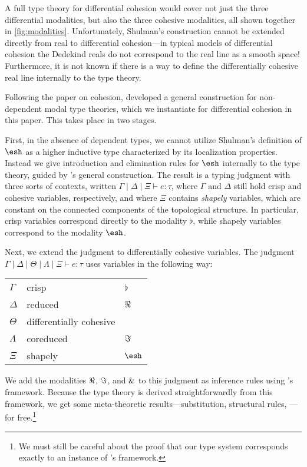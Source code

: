 \documentclass{article}
\begin{document}
A full type theory for differential cohesion would cover not just the three
differential modalities, but also the three cohesive modalities, all shown
together in \cref{fig:modalities}. Unfortunately, Shulman's construction cannot
be extended directly from real to differential cohesion---in typical models of
differential cohesion the Dedekind reals do not correspond to the real line as a
smooth space! Furthermore, it is not known if there is a way to define the
differentially cohesive real line internally to the type theory. 

Following the \citeyear{Licata2016} paper on cohesion, \citet{Licata2017}
developed a general construction for non-dependent modal type theories, which we
instantiate for differential cohesion in this paper. This takes place in two
stages.

First, in the absence of dependent types, we cannot utilize Shulman's definition
of $\shape$ as a higher inductive type characterized by its localization
properties. Instead we give introduction and elimination rules for $\shape$
internally to the type theory, guided by \citeauthor{Licata2017}'s general
construction. The result is a typing judgment with three sorts of contexts,
written $\Gamma \mid \Delta \mid \Xi \vdash e : \tau$, where $\Gamma$ and
$\Delta$ still hold crisp and cohesive variables, respectively, and where $\Xi$
contains \emph{shapely} variables, which are constant on the connected
components of the topological structure. In particular, crisp variables
correspond directly to the modality $\flat$, while shapely variables correspond
to the modality $\shape$.

Next, we extend the judgment to differentially cohesive variables. The judgment
$\Gamma \mid \Delta \mid \Theta \mid \Lambda \mid \Xi \vdash e : \tau$ uses
variables in the following way:
\begin{center} \begin{tabular}{lll}
    $\Gamma$ & crisp  &  $\flat$ \\
    $\Delta$ & reduced & $\Re$ \\
    $\Theta$ & differentially cohesive & \\
    $\Lambda$ & coreduced & $\Im$ \\
    $\Xi$ & shapely & $\shape$
\end{tabular} \end{center}
%
We add the modalities $\Re$, $\Im$, and $\&$ to this judgment as inference
rules using \citeauthor{Licata2017}'s framework. Because the type theory is
derived straightforwardly from this framework, we get some meta-theoretic
results---substitution, structural rules, \etc---for free.\footnote{We must
  still be careful about the proof that our type system corresponds exactly to
  an instance of \citeauthor{Licata2017}'s framework.} 
\end{document}
